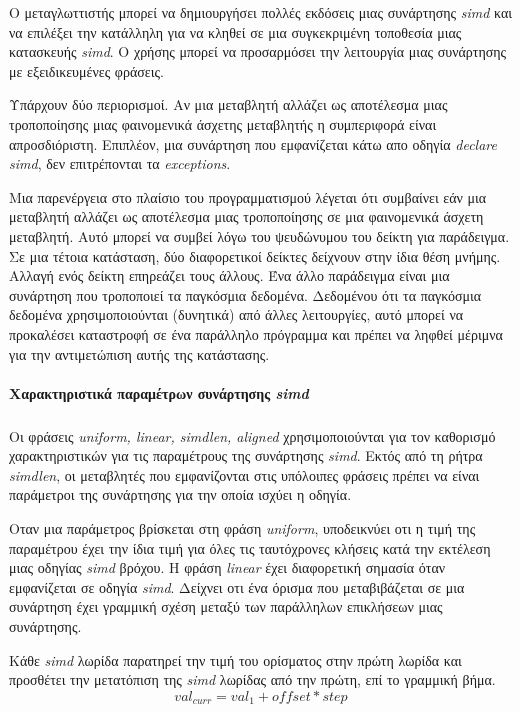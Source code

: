 \documentclass[12pt]{article}
\newcommand{\en}[1]{\foreignlanguage{english}{#1}}
\begin{document}
Ο μεταγλωττιστής μπορεί να δημιουργήσει πολλές εκδόσεις μιας συνάρτησης \emph{\en{simd}} και να επιλέξει την κατάλληλη για να κληθεί σε μια συγκεκριμένη τοποθεσία μιας κατασκευής \emph{\en{simd}}. Ο χρήσης μπορεί να προσαρμόσει την λειτουργία μιας συνάρτησης με εξειδικευμένες φράσεις.

Υπάρχουν δύο περιορισμοί. Αν μια μεταβλητή αλλάζει ως αποτέλεσμα μιας τροποποίησης μιας φαινομενικά άσχετης μεταβλητής η συμπεριφορά είναι απροσδιόριστη. Επιπλέον, μια συνάρτηση που εμφανίζεται κάτω απο οδηγία \emph{\en{declare simd}}, δεν επιτρέπονται τα \emph{\en{exceptions}}.



Μια παρενέργεια στο πλαίσιο του προγραμματισμού λέγεται ότι συμβαίνει εάν μια μεταβλητή
αλλάζει ως αποτέλεσμα μιας τροποποίησης σε μια φαινομενικά άσχετη μεταβλητή. Αυτό
μπορεί να συμβεί λόγω του ψευδώνυμου του δείκτη για παράδειγμα. Σε μια τέτοια κατάσταση, δύο
διαφορετικοί δείκτες δείχνουν στην ίδια θέση μνήμης. Αλλαγή ενός δείκτη
επηρεάζει τους άλλους. Ένα άλλο παράδειγμα είναι μια συνάρτηση που τροποποιεί τα παγκόσμια δεδομένα.
Δεδομένου ότι τα παγκόσμια δεδομένα χρησιμοποιούνται (δυνητικά) από άλλες λειτουργίες, αυτό μπορεί να προκαλέσει καταστροφή
σε ένα παράλληλο πρόγραμμα και πρέπει να ληφθεί μέριμνα για την αντιμετώπιση αυτής της κατάστασης.


\paragraph{Χαρακτηριστικά παραμέτρων συνάρτησης \emph{\en{simd}}}
\subparagraph{}
Οι φράσεις \emph{\en{uniform, linear, simdlen, aligned}} χρησιμοποιούνται για τον καθορισμό χαρακτηριστικών για τις παραμέτρους της συνάρτησης \emph{\en{simd}}. Εκτός από τη ρήτρα \emph{\en{simdlen}}, οι μεταβλητές που εμφανίζονται στις υπόλοιπες φράσεις πρέπει να είναι παράμετροι της συνάρτησης για την οποία ισχύει η οδηγία.

Οταν μια παράμετρος βρίσκεται στη φράση \emph{\en{uniform}}, υποδεικνύει οτι η τιμή της παραμέτρου έχει την ίδια τιμή για όλες τις ταυτόχρονες κλήσεις κατά την εκτέλεση μιας οδηγίας \emph{\en{simd}} βρόχου.
Η φράση \emph{\en{linear}} έχει διαφορετική σημασία όταν εμφανίζεται σε οδηγία \emph{\en{simd}}. Δείχνει οτι ένα όρισμα που μεταβιβάζεται σε μια συνάρτηση έχει γραμμική σχέση μεταξύ των παράλληλων επικλήσεων μιας συνάρτησης.

Κάθε \emph{\en{simd}} λωρίδα παρατηρεί την τιμή του ορίσματος στην πρώτη λωρίδα και προσθέτει την μετατόπιση της \emph{\en{simd}} λωρίδας από την πρώτη, επί το γραμμική βήμα.
$$val_{curr} = val_1 + offset * step $$
\end{document}
